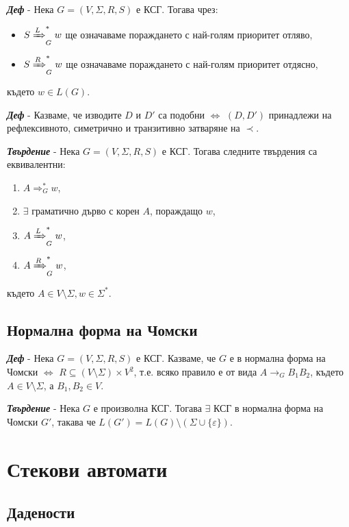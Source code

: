 \documentclass[fleqn,12pt]{article}
\begin{document}
\noindent\textit{\textbf{Деф}} - Нека $G = (V, \Sigma, R, S)$ е КСГ. Тогава чрез:
\begin{itemize}
    \item $S \xRightarrow[]{L}_G^* w$ ще означаваме пораждането с най-голям приоритет отляво,
    \item $S \xRightarrow[]{R}_G^* w$ ще означаваме пораждането с най-голям приоритет отдясно,
\end{itemize} 
където $w \in L(G)$.

\noindent\textit{\textbf{Деф}} - Казваме, че изводите $D$ и $D'$ са подобни $\iff$ $(D, D')$ принадлежи на рефлексивното, симетрично и транзитивно затваряне на $\prec$.

\noindent\textit{\textbf{Твърдение}} - Нека $G = (V, \Sigma, R, S)$ е КСГ. Тогава следните твърдения са еквивалентни:
\begin{enumerate}
    \item $A \Rightarrow_G^* w$,
    \item $\exists$ граматично дърво с корен $A$, пораждащо $w$,
    \item $A \xRightarrow[]{L}_G^* w$,
    \item $A \xRightarrow[]{R}_G^* w$,
\end{enumerate}
където $A \in V \setminus \Sigma, w \in \Sigma^*$.

\subsection{Нормална форма на Чомски}

\noindent\textit{\textbf{Деф}} - Нека $G = (V, \Sigma, R, S)$ е КСГ. Казваме, че $G$ е в нормална форма на Чомски $\iff$ $R \subseteq (V \setminus \Sigma) \times V^2$, т.е. всяко правило е от вида $A \to_G B_1B_2$, където $A \in V \setminus \Sigma$, а $B_1, B_2 \in V$.

\noindent\textit{\textbf{Твърдение}} - Нека $G$ е произволна КСГ. Тогава $\exists$ КСГ в нормална форма на Чомски $G'$, такава че $L(G') = L(G) \setminus (\Sigma \cup \{\varepsilon\})$.

\section{Стекови автомати}

\subsection{Дадености}
\end{document}
